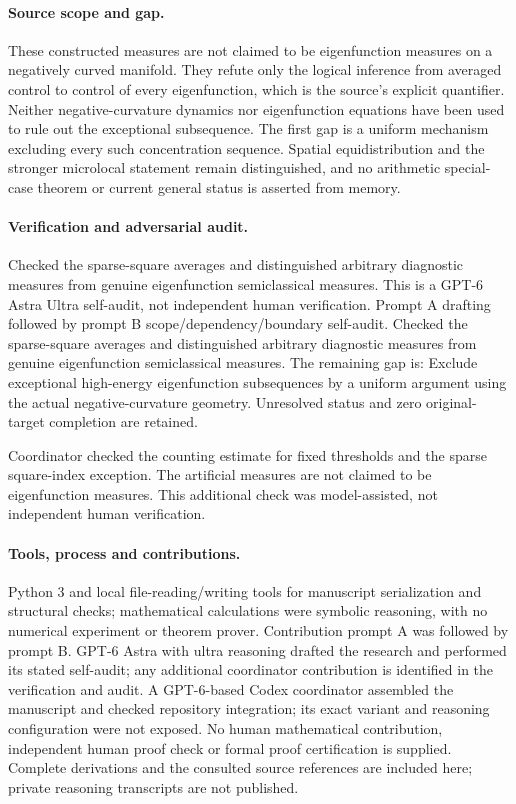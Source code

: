 \documentclass[11pt]{article}
\begin{document}
\paragraph{Source scope and gap.} These constructed measures are not claimed to be eigenfunction measures on a negatively curved manifold. They refute only the logical inference from averaged control to control of every eigenfunction, which is the source's explicit quantifier. Neither negative-curvature dynamics nor eigenfunction equations have been used to rule out the exceptional subsequence. The first gap is a uniform mechanism excluding every such concentration sequence. Spatial equidistribution and the stronger microlocal statement remain distinguished, and no arithmetic special-case theorem or current general status is asserted from memory.

\paragraph{Verification and adversarial audit.}
Checked the sparse-square averages and distinguished arbitrary diagnostic measures from genuine eigenfunction semiclassical measures. This is a GPT-6 Astra Ultra self-audit, not independent human verification. Prompt A drafting followed by prompt B scope/dependency/boundary self-audit. Checked the sparse-square averages and distinguished arbitrary diagnostic measures from genuine eigenfunction semiclassical measures. The remaining gap is: Exclude exceptional high-energy eigenfunction subsequences by a uniform argument using the actual negative-curvature geometry. Unresolved status and zero original-target completion are retained.

Coordinator checked the counting estimate for fixed thresholds and the sparse square-index exception. The artificial measures are not claimed to be eigenfunction measures. This additional check was model-assisted, not independent human verification.

\paragraph{Tools, process and contributions.}
Python 3 and local file-reading/writing tools for manuscript serialization and structural checks; mathematical calculations were symbolic reasoning, with no numerical experiment or theorem prover. Contribution prompt A was followed by prompt B. GPT-6 Astra with ultra reasoning drafted the research and performed its stated self-audit; any additional coordinator contribution is identified in the verification and audit. A GPT-6-based Codex coordinator assembled the manuscript and checked repository integration; its exact variant and reasoning configuration were not exposed. No human mathematical contribution, independent human proof check or formal proof certification is supplied. Complete derivations and the consulted source references are included here; private reasoning transcripts are not published.
\end{document}

